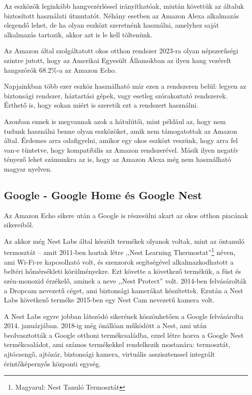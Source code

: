 \documentclass[
]{thesis-ekf}
\theoremstyle{definition}
\theoremstyle{remark}
\begin{document}
	Az eszközök leginkább hangvezérléssel irányíthatóak, miután követtük az általuk biztosított használati útmutatót. Néhány esetben az Amazon Alexa alkalmazás elegendő lehet, de ha olyan eszközt szeretnénk használni, amelyhez saját alkalmazás tartozik, akkor azt is le kell töltenünk.
	
	Az Amazon által szolgáltatott okos otthon rendszer 2023-ra olyan népszerűségi szintre jutott, hogy az Amerikai Egyesült Államokban az ilyen hang vezérelt hangszórók 68.2\%-a az Amazon Echo.\cite{amazon-stats}
	
	Napjainkban több ezer eszköz használható már ezen a rendszeren belül: legyen az biztonsági rendszer, háztartási gépek, vagy esetleg szórakoztató rendszerek. Érthető is, hogy sokan miért is szeretik ezt a rendszert használni.
	
	Azonban ennek is megvannak azok a hátulütői, mint például az, hogy nem tudunk használni benne olyan eszközöket, amik nem támogatottak az Amazon által. Érdemes arra odafigyelni, amikor egy okos eszközt veszünk, hogy arra fel van-e tüntetve, hogy kompatibilis az Amazon rendszerével. Másik ilyen negatív tényező lehet számunkra az is, hogy az Amazon Alexa még nem használható magyar nyelven.
	
	\subsection{Google - Google Home és Google Nest}
	Az Amazon Echo sikere után a Google is részesülni akart az okos otthon piacának sikereiből. 
	
	Az akkor még Nest Labs által készült termékek olyanok voltak, mint az öntanuló termosztát -- amit 2011-ben hoztak létre ,,Nest Learning Thermostat''\footnote{Magyarul: Nest Tanuló Termosztát} néven, ami Wi-Fi-re kapcsolható volt, és szenzorok segítségével alkalmazkodhatott a beltéri hőmérsékleti körülményekre. Ezt követte a következő termékük, a füst és szén-monoxid érzékelő, aminek a neve ,,Nest Protect'' volt. 2014-ben felvásárolták a Dropcam nevezetű céget, ami biztonsági kamerákat készítettek. Ezután a Nest Labs következő terméke 2015-ben egy Nest Cam nevezetű kamera volt.
	
	A Nest Labs egyre jobban látszódó sikerének köszönhetően a Google felvásárolta 2014. januárjában. 2018-ig még önállóan működött a Nest, ami után beolvasztották a Google otthoni termékcsaládba, ezzel létre hozva a Google Nest termékcsaládot, ami számos termékekkel rendelkezik mostanára: termosztát, ajtócsengő, ajtózár, biztonsági kamera, virtuális asszisztenssel integrált érintőképernyős központi egység.\cite{google-home-nest}
	
\end{document}
